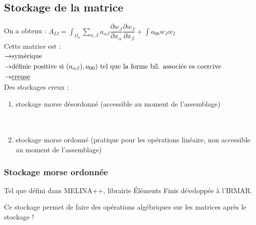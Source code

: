 \documentclass[12pt,a4paper]{article}
\begin{document}
	\subsection{Stockage de la matrice}
	
	On a obtenu : $A_{IJ} = \displaystyle\int_{\Omega_h} \sum_{\alpha,\beta}a_{\alpha\beta}\dfrac{\partial w_J}{\partial x_\alpha}\dfrac{\partial w_J}{\partial x_\beta} + \int a_{00}w_Jw_I$\\
	
	Cette matrice est : $\begin{aligned}[t]
		\to & \text{symérique}\\
		\to & \text{définie positive si $(a_{\alpha\beta}),a_{00})$ tel que la forme bil. associée es coercive}\\
		\to & \text{\underline{creuse}}
	\end{aligned}$\\
	
	Des stockages creux :
	\begin{enumerate}[label=$\star$]
		\item stockage morse désordonné (accessible au moment de l'assemblage)\\
		
		\\
		
		\\
		
		
		\item stockage morse ordonné (pratique pour les opérations linéaire, non accessible au moment de l'assemblage)\\
		
	\end{enumerate}

	\subsubsection{Stockage morse ordonnée}
	
	Tel que défini dans MELINA++, librairie Éléments Finis développée à l'IRMAR.\\
	
	Ce stockage permet de faire des opérations algébriques sur les matrices après le stockage !
	
	\newpage
	
\end{document}
